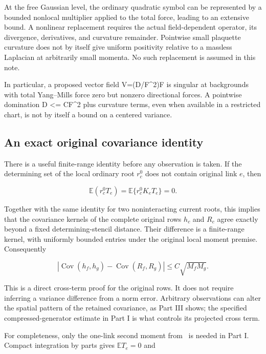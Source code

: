 \documentclass[
  11pt,
]{article}
\begin{document}
At the free Gaussian level, the ordinary quadratic symbol can be
represented by a bounded nonlocal multiplier applied to the total force,
leading to an extensive bound. A nonlinear replacement requires the
actual field-dependent operator, its divergence, derivatives, and
curvature remainder. Pointwise small plaquette curvature does not by
itself give uniform positivity relative to a massless Laplacian at
arbitrarily small momenta. No such replacement is assumed in this note.

In particular, a proposed vector field V=(D/\textbar F\textbar\^{}2)F is
singular at backgrounds with total Yang--Mills force zero but nonzero
directional forces. A pointwise domination D \textless=
C\textbar F\textbar\^{}2 plus curvature terms, even when available in a
restricted chart, is not by itself a bound on a centered variance.

\hypertarget{an-exact-original-covariance-identity}{%
\subsection{An exact original covariance
identity}\label{an-exact-original-covariance-identity}}

There is a useful finite-range identity before any observation is taken.
If the determining set of the local ordinary root \(r_c^0\) does not
contain original link \(e\), then

\[
 \mathbb E(r_c^0T_e)=\mathbb E\{r_c^0 K_eT_e\}=0.
\]

Together with the same identity for two noninteracting current roots,
this implies that the covariance kernels of the complete original rows
\(h_c\) and \(R_c\) agree exactly beyond a fixed determining-stencil
distance. Their difference is a finite-range kernel, with uniformly
bounded entries under the original local moment premise. Consequently

\[
 |\operatorname{Cov}(h_f,h_g)-\operatorname{Cov}(R_f,R_g)|
 \le C\sqrt{M_fM_g}.
\]

This is a direct cross-term proof for the original rows. It does not
require inferring a variance difference from a norm error. Arbitrary
observations can alter the spatial pattern of the retained covariance,
as Part III shows; the specified compressed-generator estimate in Part I
is what controls its projected cross term.

For completeness, only the one-link second moment from~\cite{CT} is
needed in Part I. Compact integration by parts gives \(\mathbb ET_e=0\)
and
\end{document}
